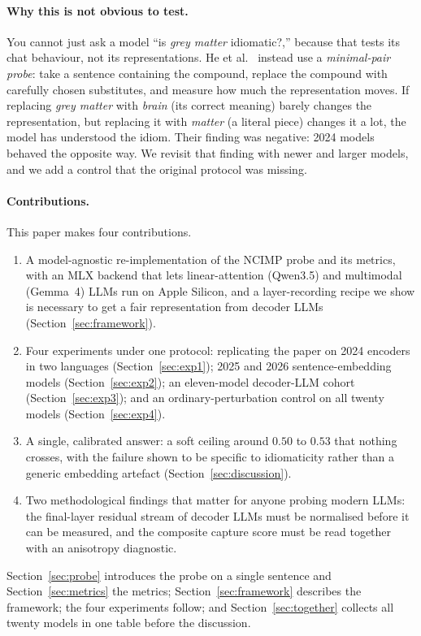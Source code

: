 \documentclass[11pt]{article}
\begin{document}
\paragraph{Why this is not obvious to test.} You cannot just ask a model ``is \emph{grey matter}
idiomatic?,'' because that tests its chat behaviour, not its representations. He et
al.~\cite{he2025idiomaticity} instead use a \emph{minimal-pair probe}: take a sentence containing
the compound, replace the compound with carefully chosen substitutes, and measure how much the
representation moves. If replacing \emph{grey matter} with \emph{brain} (its correct meaning)
barely changes the representation, but replacing it with \emph{matter} (a literal piece) changes it
a lot, the model has understood the idiom. Their finding was negative: 2024 models behaved the
opposite way. We revisit that finding with newer and larger models, and we add a control that the
original protocol was missing.

\paragraph{Contributions.} This paper makes four contributions.
\begin{enumerate}
  \item A model-agnostic re-implementation of the NCIMP probe and its metrics, with an MLX backend
  that lets linear-attention (Qwen3.5) and multimodal (Gemma~4) LLMs run on Apple Silicon, and a
  layer-recording recipe we show is necessary to get a fair representation from decoder LLMs
  (Section~\ref{sec:framework}).
  \item Four experiments under one protocol: replicating the paper on 2024 encoders in two
  languages (Section~\ref{sec:exp1}); 2025 and 2026 sentence-embedding models
  (Section~\ref{sec:exp2}); an eleven-model decoder-LLM cohort (Section~\ref{sec:exp3}); and an
  ordinary-perturbation control on all twenty models (Section~\ref{sec:exp4}).
  \item A single, calibrated answer: a soft ceiling around $0.50$ to $0.53$ that nothing crosses,
  with the failure shown to be specific to idiomaticity rather than a generic embedding artefact
  (Section~\ref{sec:discussion}).
  \item Two methodological findings that matter for anyone probing modern LLMs: the final-layer
  residual stream of decoder LLMs must be normalised before it can be measured, and the composite
  capture score must be read together with an anisotropy diagnostic.
\end{enumerate}
Section~\ref{sec:probe} introduces the probe on a single sentence and Section~\ref{sec:metrics} the
metrics; Section~\ref{sec:framework} describes the framework; the four experiments follow; and
Section~\ref{sec:together} collects all twenty models in one table before the discussion.
\end{document}
